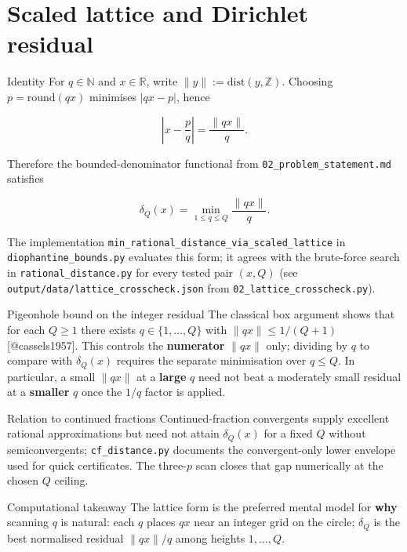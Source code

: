 \documentclass[
  ignorenonframetext,
]{beamer}
\author{\texorpdfstring{}{}}
\date{}
\begin{document}
\section{Scaled lattice and Dirichlet
residual}\label{scaled-lattice-and-dirichlet-residual}

\begin{frame}[fragile]{Identity}
\protect{}\label{identity}
For \(q \in \mathbb{N}\) and \(x \in \mathbb{R}\), write
\(\|y\| := \mathrm{dist}(y,\mathbb{Z})\). Choosing
\(p = \mathrm{round}(qx)\) minimises \(|qx - p|\), hence

\[
\left|x - \frac{p}{q}\right| = \frac{\|qx\|}{q}.
\]

Therefore the bounded-denominator functional from
\texttt{02\_problem\_statement.md} satisfies

\[
\delta_Q(x) = \min_{1 \leq q \leq Q} \frac{\|qx\|}{q}.
\]

The implementation
\texttt{min\_rational\_distance\_via\_scaled\_lattice} in
\texttt{diophantine\_bounds.py} evaluates this form; it agrees with the
brute-force search in \texttt{rational\_distance.py} for every tested
pair \((x,Q)\) (see \texttt{output/data/lattice\_crosscheck.json} from
\texttt{02\_lattice\_crosscheck.py}).
\end{frame}

\begin{frame}{Pigeonhole bound on the integer residual}
\protect{}\label{pigeonhole-bound-on-the-integer-residual}
The classical box argument shows that for each \(Q \geq 1\) there exists
\(q \in \{1,\ldots,Q\}\) with \(\|qx\| \leq 1/(Q+1)\)
{[}@cassels1957{]}. This controls the \textbf{numerator} \(\|qx\|\)
only; dividing by \(q\) to compare with \(\delta_Q(x)\) requires the
separate minimisation over \(q \leq Q\). In particular, a small
\(\|qx\|\) at a \textbf{large} \(q\) need not beat a moderately small
residual at a \textbf{smaller} \(q\) once the \(1/q\) factor is applied.
\end{frame}

\begin{frame}[fragile]{Relation to continued fractions}
\protect{}\label{relation-to-continued-fractions}
Continued-fraction convergents supply excellent rational approximations
but need not attain \(\delta_Q(x)\) for a fixed \(Q\) without
semiconvergents; \texttt{cf\_distance.py} documents the convergent-only
lower envelope used for quick certificates. The three-\(p\) scan closes
that gap numerically at the chosen \(Q\) ceiling.
\end{frame}

\begin{frame}{Computational takeaway}
\protect{}\label{computational-takeaway}
The lattice form is the preferred mental model for \textbf{why} scanning
\(q\) is natural: each \(q\) places \(qx\) near an integer grid on the
circle; \(\delta_Q\) is the best normalised residual \(\|qx\|/q\) among
heights \(1,\ldots,Q\).
\end{frame}
\end{document}
